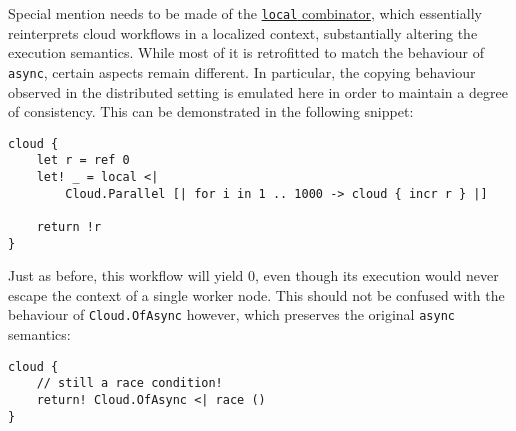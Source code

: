 \label{localSemantics}
Special mention needs to be made of the \hyperref[localCombinator]{\texttt{local} combinator},
which essentially reinterprets cloud workflows in a localized context,
substantially altering the execution semantics. While most of it is retrofitted
to match the behaviour of \texttt{async}, certain aspects remain different.
In particular, the copying behaviour observed in the distributed setting is emulated here
in order to maintain a degree of consistency. This can be demonstrated in the following
snippet:
\begin{lstlisting}
cloud {
    let r = ref 0
    let! _ = local <| 
    	Cloud.Parallel [| for i in 1 .. 1000 -> cloud { incr r } |]

    return !r
}
\end{lstlisting}
Just as before, this workflow will yield 0, even though its execution would never
escape the context of a single worker node. This should not be confused with the
behaviour of \texttt{Cloud.OfAsync} however, which preserves the original \texttt{async}
semantics:
\begin{lstlisting}
cloud {
	// still a race condition!
	return! Cloud.OfAsync <| race ()
}
\end{lstlisting}



